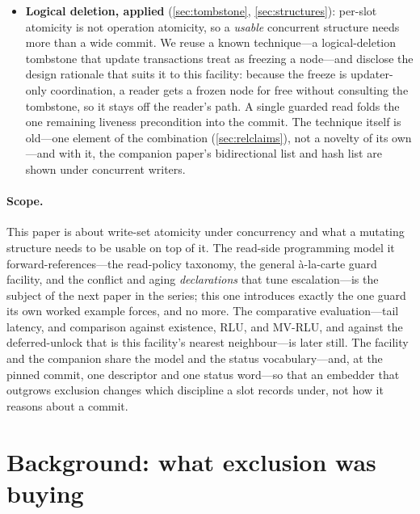 \documentclass[11pt]{article}
\begin{document}
\begin{itemize}
\item \textbf{Logical deletion, applied} (\cref{sec:tombstone},
      \cref{sec:structures}): per-slot atomicity is not operation atomicity, so a
      \emph{usable} concurrent structure needs more than a wide commit. We reuse a
      known technique---a logical-deletion tombstone that update transactions
      treat as freezing a node---and disclose the design rationale that suits it
      to this facility: because the freeze is updater-only coordination, a reader
      gets a frozen node for free without consulting the tombstone, so it stays
      off the reader's path. A single guarded read folds the one remaining
      liveness precondition into the commit. The technique itself is old---one element
      of the combination (\cref{sec:relclaims}), not a novelty of its own---and
      with it, the companion paper's bidirectional list and hash list are shown
      under concurrent writers.
\end{itemize}

\paragraph{Scope.} This paper is about write-set atomicity under concurrency and
what a mutating structure needs to be usable on top of it. The read-side
programming model it forward-references---the read-policy taxonomy, the
general à-la-carte guard facility, and the conflict and aging
\emph{declarations} that tune escalation---is the subject of the next paper in
the series; this one introduces exactly the one guard its own worked example
forces, and no more. The comparative evaluation---tail latency, and
comparison against existence, RLU, and MV-RLU, and against the deferred-unlock
\kcas that is this facility's nearest neighbour---is later still.
The facility and the companion \fliplatch share the model and the status
vocabulary---and, at the pinned commit, one descriptor and one status
word---so that an embedder that outgrows exclusion changes which discipline a
slot records under, not how it reasons about a commit.

\section{Background: what exclusion was buying}
\label{sec:background}
\end{document}
